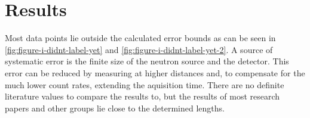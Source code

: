 \chapter{Results}\label{chap:explaining-shitty-results}%
Most data points lie outside the calculated error bounds as can be seen in \autoref{fig:figure-i-didnt-label-yet} and \autoref{fig:figure-i-didnt-label-yet-2}.
A source of systematic error is the finite size of the neutron source and the detector.
This error can be reduced by measuring at higher distances and, to compensate for the much lower count rates, extending the aquisition time.
There are no definite literature values  to compare the results to, but the results of most research papers and other groups lie close to the determined lengths.
